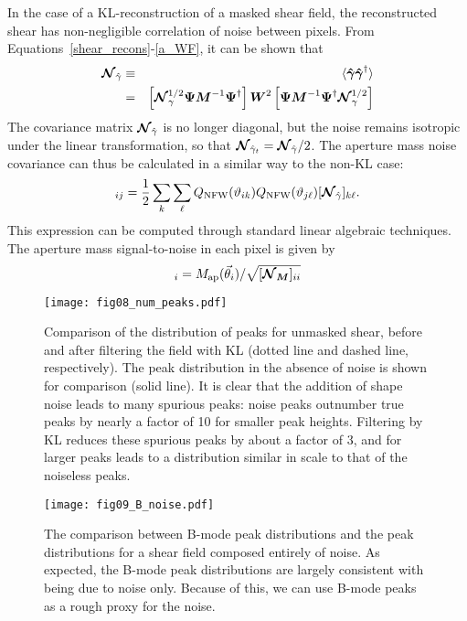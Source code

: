 In the case of a KL-reconstruction of a masked shear field, the reconstructed
shear has non-negligible correlation of noise between pixels.  
From Equations~\ref{shear_recons}-\ref{a_WF}, it can be shown that
\begin{eqnarray}
  \boldsymbol{\mathcal{N}}_{\hat\gamma} 
  & \equiv  &
  \langle\boldsymbol{\hat\gamma} \boldsymbol{\hat\gamma}^\dagger\rangle\nonumber\\
  & = & \left[\boldsymbol{\mathcal{N}}_\gamma^{1/2}\boldsymbol{\Psi} \boldsymbol{M}^{-1} \boldsymbol{\Psi}^\dagger\right]
  \boldsymbol{W}^2 
  \left[\boldsymbol{\Psi} \boldsymbol{M}^{-1} \boldsymbol{\Psi}^\dagger \boldsymbol{\mathcal{N}}_\gamma^{1/2}\right]
\end{eqnarray}
The covariance matrix $\boldsymbol{\mathcal{N}}_{\hat\gamma}$ is no longer diagonal, but
the noise remains isotropic under the linear transformation, so that
$\boldsymbol{\mathcal{N}}_{\hat{\gamma}_t} = \boldsymbol{\mathcal{N}}_{\hat{\gamma}}/2$.
The aperture mass noise covariance can thus be calculated in a similar 
way to the non-KL case:
\begin{equation}
  [\Noise_M]_{ij} = \frac{1}{2}\sum_k\sum_\ell Q_{\rm NFW}(\vartheta_{ik})
  Q_{\rm NFW}(\vartheta_{j\ell}) [\Noise_{\hat\gamma}]_{k\ell}.
\end{equation}
This expression can be computed through standard linear algebraic techniques.  
The aperture mass signal-to-noise in each pixel is given by 
\begin{equation}
  [S/N]_i = M_{\rm ap}(\vec\theta_i)/\sqrt{[\mymat{\Noise_M}]_{ii}}
\end{equation}

\begin{figure}
 \centering
 \texttt{[image: fig08\_num\_peaks.pdf]}
 \caption[Comparison of the distribution of \Map peaks for unmasked shear]{
   Comparison of the distribution of \Map peaks for unmasked shear,
   before and after filtering
   the field with KL (dotted line and dashed line, respectively).  The
   peak distribution in the absence of noise is shown for comparison
   (solid line).  It is clear that the addition of shape noise leads to 
   many spurious \Map peaks: noise peaks outnumber true peaks by nearly a
   factor of 10 for smaller peak heights.  Filtering by KL reduces these
   spurious peaks by about a factor of 3, and for larger peaks leads
   to a distribution similar in scale to that of the noiseless peaks.
   \label{fig_num_peaks}  
 } 
\end{figure}

\begin{figure}
 \centering
 \texttt{[image: fig09\_B\_noise.pdf]}
 \caption[B-mode peak distributions]
 {The comparison between B-mode peak distributions and the
   peak distributions for a shear field composed entirely of noise.
   As expected, the B-mode peak distributions are largely consistent
   with being due to noise only.  Because of this, we can use B-mode
   peaks as a rough proxy for the noise.
   \label{fig_B_noise} 
 }
\end{figure}

